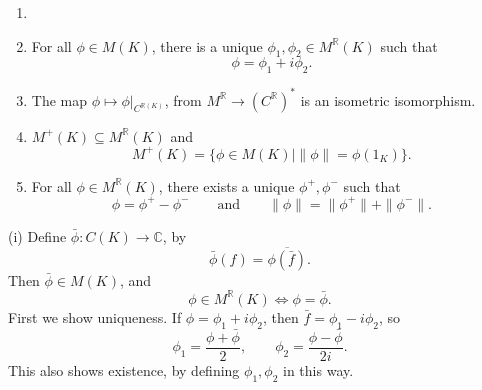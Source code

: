 \documentclass[12pt]{article}
\begin{document}
\begin{lemma}
	\begin{enumerate}[\normalfont(i)]
		\item[]
\item For all $\phi \in M(K)$, there is a unique $\phi_1, \phi_2 \in M^{\mathbb{R}}(K)$ such that
	\[
	\phi = \phi_1 + i \phi_2.
	\]
	\item The map $\phi \mapsto \phi|_{C^{\mathbb{R}(K)}}$, from $M^{\mathbb{R}} \to (C^{\mathbb{R}})^\ast$ is an isometric isomorphism.
	\item $M^+(K) \subseteq M^\mathbb{R}(K)$ and
		\[
			M^+(K) = \{ \phi \in M(K) \mid \|\phi\| = \phi(1_K)\}.
		\]
	\item For all $\phi \in M^\mathbb{R}(K)$, there exists a unique $\phi^+, \phi^-$ such that
		\[
			\phi = \phi^+ - \phi^- \qquad \text{and} \qquad \|\phi\| = \|\phi^+\| + \|\phi^-\|.
		\]
\end{enumerate}
\end{lemma}

\begin{proofbox}
	

	(i) Define $\bar \phi : C(K) \to \mathbb{C}$, by
	\[
	\bar \phi(f) = \overline{\phi(\bar f)}.
	\]
	Then $\bar \phi \in M(K)$, and
	\[
	\phi \in M^{\mathbb{R}}(K) \iff \phi = \bar \phi.
	\]
	First we show uniqueness. If $\phi = \phi_1 + i \phi_2$, then $\bar f = \phi_1 - i \phi_2$, so
	\[
	\phi_1 = \frac{\phi + \bar \phi}{2}, \qquad \phi_2 = \frac{\phi - \bar \phi}{2i}.
	\]
	This also shows existence, by defining $\phi_1, \phi_2$ in this way.
\end{proofbox}



\newpage

\printindex
\end{document}
